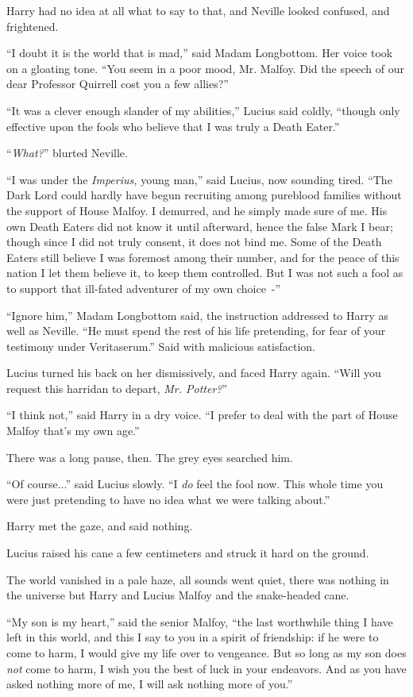 Harry had no idea at all what to say to that, and Neville looked confused, and frightened.

``I doubt it is the world that is mad,'' said Madam Longbottom. Her voice took on a gloating tone. ``You seem in a poor mood, Mr. Malfoy. Did the speech of our dear Professor Quirrell cost you a few allies?''

``It was a clever enough slander of my abilities,'' Lucius said coldly, ``though only effective upon the fools who believe that I was truly a Death Eater.''

``\emph{What?}'' blurted Neville.

``I was under the \emph{Imperius,} young man,'' said Lucius, now sounding tired. ``The Dark Lord could hardly have begun recruiting among pureblood families without the support of House Malfoy. I demurred, and he simply made sure of me. His own Death Eaters did not know it until afterward, hence the false Mark I bear; though since I did not truly consent, it does not bind me. Some of the Death Eaters still believe I was foremost among their number, and for the peace of this nation I let them believe it, to keep them controlled. But I was not such a fool as to support that ill-fated adventurer of my own choice~-''

``Ignore him,'' Madam Longbottom said, the instruction addressed to Harry as well as Neville. ``He must spend the rest of his life pretending, for fear of your testimony under Veritaserum.'' Said with malicious satisfaction.

Lucius turned his back on her dismissively, and faced Harry again. ``Will you request this harridan to depart, \emph{Mr. Potter?}''

``I think not,'' said Harry in a dry voice. ``I prefer to deal with the part of House Malfoy that's my own age.''

There was a long pause, then. The grey eyes searched him.

``Of course...'' said Lucius slowly. ``I \emph{do} feel the fool now. This whole time you were just pretending to have no idea what we were talking about.''

Harry met the gaze, and said nothing.

Lucius raised his cane a few centimeters and struck it hard on the ground.

The world vanished in a pale haze, all sounds went quiet, there was nothing in the universe but Harry and Lucius Malfoy and the snake-headed cane.

``My son is my heart,'' said the senior Malfoy, ``the last worthwhile thing I have left in this world, and this I say to you in a spirit of friendship: if he were to come to harm, I would give my life over to vengeance. But so long as my son does \emph{not} come to harm, I wish you the best of luck in your endeavors. And as you have asked nothing more of me, I will ask nothing more of you.''

